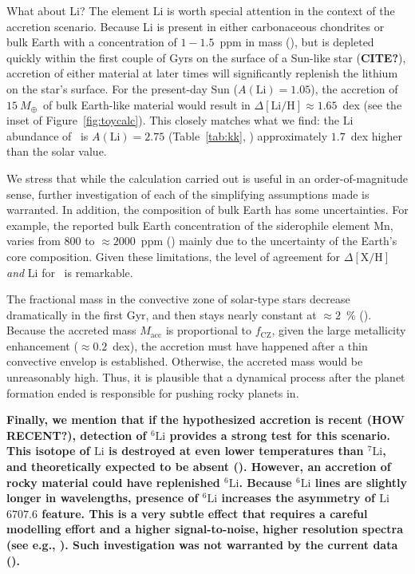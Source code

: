 \documentclass[modern, letterpaper]{aastex61}
\newcommand{\figname}{Figure}
\newcommand*\elem[1]{\ensuremath{\mathrm{#1}}}
\newcommand*\elemH[1]{\ensuremath{[\mathrm{#1}/\elem{H}]}}
\newcommand{\bizarreone}{\text{Kronos}}
\newcommand{\mearth}{\ensuremath{M_\oplus}}
\newcommand{\maccreted}{\ensuremath{15~\mearth}}
\newcommand*{\askjmb}[1]{{\bf #1}}
\begin{document}
What about \elem{Li}?
The element \elem{Li} is worth special attention in the context of the
accretion scenario.
Because Li is present in either carbonaceous chondrites or bulk Earth with a
concentration of $1-1.5$~ppm in mass (\citealt{2003TrGeo...2..547M}), but
is depleted quickly within the first couple of Gyrs on the surface of a
Sun-like star (\askjmb{CITE?}), accretion of either material at later times
will significantly replenish the lithium on the star's surface.
For the present-day Sun ($A(\elem{Li}) = 1.05$), the accretion of \maccreted\ of
bulk Earth-like material would result in $\Delta\elemH{Li} \approx 1.65$~dex
(see the inset of \figname~\ref{fig:toycalc}).
This closely matches what we find: the \elem{Li} abundance of \bizarreone\ is
$A(\elem{Li}) = 2.75$ (Table~\ref{tab:kk}, \citealt{jmlithium})
approximately $1.7$~dex higher than the solar value.

We stress that while the calculation carried out is useful in
an order-of-magnitude sense, further investigation of each of the simplifying
assumptions made is warranted.
In addition, the composition of bulk Earth has some uncertainties.
For example, the reported bulk Earth concentration of the siderophile element
\elem{Mn}, varies from $800$ to $\approx 2000$~ppm
(\citealt{1998psc..book.....L,mcdonough2001composition,2003TrGeo...2..547M})
mainly due to the uncertainty of the Earth's core composition.
Given these limitations, the level of agreement for $\Delta\elemH{X}$ {\it and}
\elem{Li} for \bizarreone\ is remarkable.

The fractional mass in the convective zone of solar-type stars
decrease dramatically in the first Gyr,
and then stays nearly constant at $\approx 2$~\% (\citealt{2013ApJ...776...87S}).
Because the accreted mass $M_\mathrm{acc}$ is proportional to $f_\mathrm{CZ}$,
given the large metallicity enhancement ($\approx 0.2$~dex),
the accretion must have happened after a thin convective envelop is established.
Otherwise, the accreted mass would be unreasonably high.
Thus, it is plausible that a dynamical process after the planet formation ended
is responsible for pushing rocky planets in.

{\bf
Finally, we mention that if the hypothesized accretion is
\askjmb{recent (HOW RECENT?)},
detection of $^6 \elem{Li}$ provides a strong test for this
scenario.
This isotope of \elem{Li} is destroyed at even lower temperatures than
$^7\elem{Li}$, and theoretically expected to be absent
(\citealt{1997ARA&A..35..557P}).
However, an accretion of rocky material could have replenished $^6 \elem{Li}$.
Because $^6\elem{Li}$ lines are slightly longer in wavelengths,
presence of $^6\elem{Li}$ increases the asymmetry of \elem{Li} $6707.6$ feature.
This is a very subtle effect that requires a careful modelling effort
and a higher signal-to-noise, higher resolution spectra
(see e.g., \citealt{Israelian:2001,2002MNRAS.335.1005R}).
Such investigation was not warranted by the current data (\citealt{jmlithium}).
}
\end{document}
